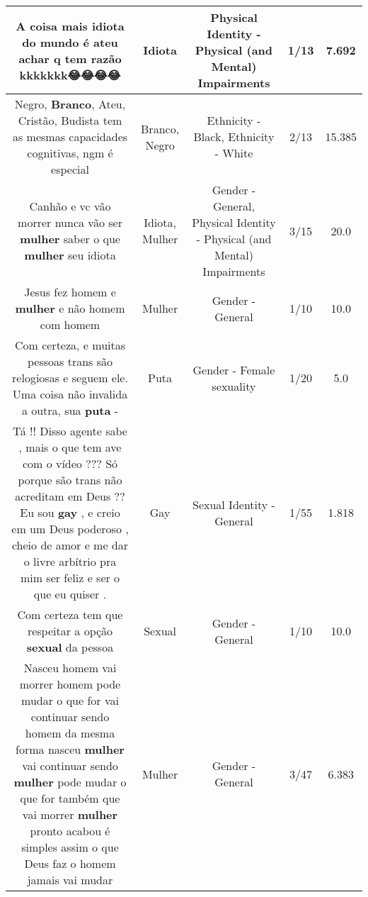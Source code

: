 \documentclass[11pt]{article}
\newlength\mylength
\begin{document}
\begin{center}
\begin{longtable}{|C{.65\mylength}|C{.30\mylength}|C{.12\mylength}|C{.12\mylength}|C{.12\mylength}|}
  \small A coisa mais \textbf{idiota} do mundo é ateu achar q tem razão kkkkkkk😂😂😂😂\normalsize   & Idiota & Physical Identity - Physical (and Mental) Impairments & 1/13 & 7.692 \\  \hline
  \small Negro, \textbf{Branco}, Ateu, Cristão, Budista tem as mesmas capacidades cognitivas, ngm é especial\normalsize   & Branco, Negro & Ethnicity - Black, Ethnicity - White & 2/13 & 15.385 \\  \hline
  \small Canhão e vc  vão  morrer  nunca vão ser \textbf{mulher}  saber o que \textbf{mulher}  seu idiota\normalsize   & Idiota, Mulher & Gender - General, Physical Identity - Physical (and Mental) Impairments & 3/15 & 20.0 \\  \hline
  \small Jesus fez homem e \textbf{mulher} e não homem com homem\normalsize   & Mulher & Gender - General & 1/10 & 10.0 \\  \hline
  \small Com certeza, e muitas pessoas trans são relogiosas e seguem ele. Uma coisa não invalida a outra, sua \textbf{puta}  - \normalsize   & Puta & Gender - Female sexuality & 1/20 & 5.0 \\  \hline
  \small Tá !! Disso agente sabe , mais o que tem ave com o vídeo ??? Só porque são trans não acreditam em Deus ?? Eu sou \textbf{gay}  , e creio em um Deus poderoso , cheio de amor e me dar o livre arbítrio pra mim ser feliz e ser o que eu quiser .\normalsize   & Gay & Sexual Identity - General & 1/55 & 1.818 \\  \hline
  \small Com certeza tem que respeitar a opção \textbf{sexual} da pessoa\normalsize   & Sexual & Gender - General & 1/10 & 10.0 \\  \hline
  \small Nasceu homem vai morrer homem pode mudar o que for vai continuar sendo homem da mesma forma nasceu \textbf{mulher} vai continuar sendo \textbf{mulher} pode mudar o que for também que vai morrer \textbf{mulher} pronto acabou é simples assim o que Deus faz o homem jamais vai mudar\normalsize   & Mulher & Gender - General & 3/47 & 6.383 \\  \hline

\end{longtable}
\end{center}
\end{document}
